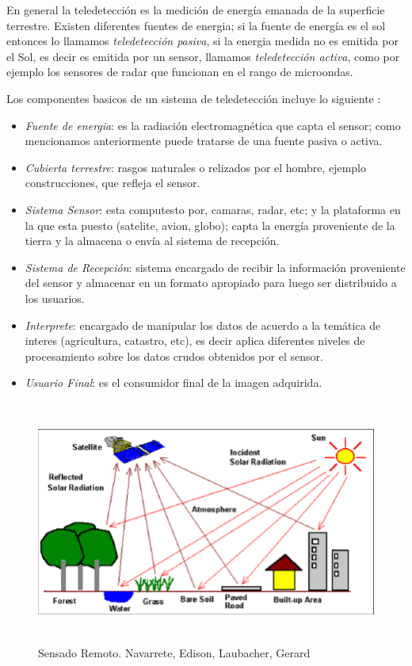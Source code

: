 En general la teledetección es la medición de energía emanada de la superficie terrestre. Existen diferentes fuentes de energia; si la fuente de energía es el sol entonces lo llamamos \textit{teledetección pasiva}, si la energia medida no es emitida por el Sol, es decir es emitida por un sensor, llamamos \textit{teledetección activa}, como por ejemplo los sensores de radar que funcionan en el rango de microondas.

Los componentes basicos de un sistema de teledetección incluye lo siguiente \citep{chuvieco}:
\begin{itemize}
\item \textit{Fuente de energia}: es la radiación electromagnética que capta el sensor; como mencionamos anteriormente puede tratarse de una fuente pasiva o activa.

\item \textit{Cubierta terrestre}: rasgos naturales o relizados por el hombre, ejemplo construcciones, que refleja el sensor.

\item \textit{Sistema Sensor}: esta computesto por, camaras, radar, etc; y la plataforma en la que esta puesto (satelite, avion, globo);  capta la energía proveniente de la tierra y la almacena o envía al sistema de recepción.

\item \textit{Sistema de Recepción}: sistema encargado de recibir la información proveniente del sensor y almacenar en un formato apropiado para luego ser distribuido a los usuarios.

\item \textit{Interprete}: encargado de manipular los datos de acuerdo a la temática de interes (agricultura, catastro, etc), es decir aplica diferentes niveles de procesamiento sobre los datos crudos obtenidos por el sensor.

\item \textit{Usuario Final}: es el consumidor final de la imagen adquirida.
\end{itemize}

\begin{figure}[H] \centering
  \includegraphics[height=8cm,keepaspectratio=true,clip=true]{imagenes/MarcoTeorico/teledeteccion.png}
  \caption{Sensado Remoto. Navarrete, Edison, Laubacher, Gerard}\label{Fig:teledeteccion}
\end{figure}

